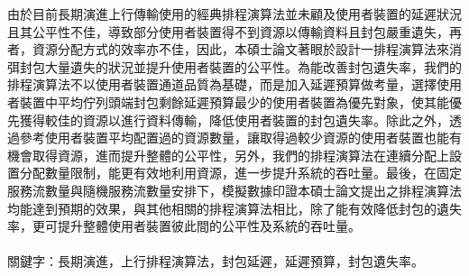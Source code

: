 
由於目前長期演進上行傳輸使用的經典排程演算法並未顧及使用者裝置的延遲狀況且其公平性不佳，導致部分使用者裝置得不到資源以傳輸資料且封包嚴重遺失，再者，資源分配方式的效率亦不佳，因此，本碩士論文著眼於設計一排程演算法來消弭封包大量遺失的狀況並提升使用者裝置的公平性。為能改善封包遺失率，我們的排程演算法不以使用者裝置通道品質為基礎，而是加入延遲預算做考量，選擇使用者裝置中平均佇列頭端封包剩餘延遲預算最少的使用者裝置為優先對象，使其能優先獲得較佳的資源以進行資料傳輸，降低使用者裝置的封包遺失率。除此之外，透過參考使用者裝置平均配置過的資源數量，讓取得過較少資源的使用者裝置也能有機會取得資源，進而提升整體的公平性，另外，我們的排程演算法在連續分配上設置分配數量限制，能更有效地利用資源，進一步提升系統的吞吐量。最後，在固定服務流數量與隨機服務流數量安排下，模擬數據印證本碩士論文提出之排程演算法均能達到預期的效果，與其他相關的排程演算法相比，除了能有效降低封包的遺失率，更可提升整體使用者裝置彼此間的公平性及系統的吞吐量。
\\
\\
關鍵字：長期演進，上行排程演算法，封包延遲，延遲預算，封包遺失率。
